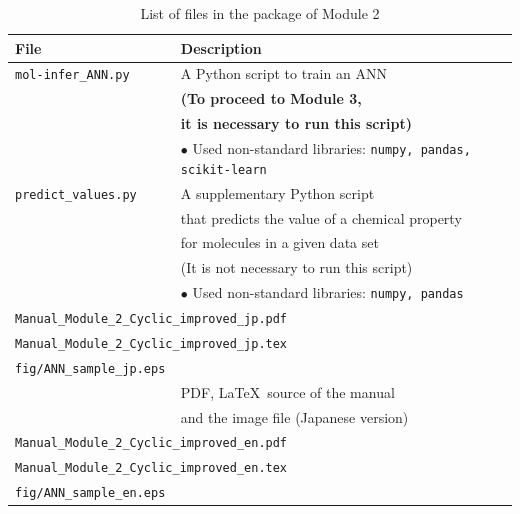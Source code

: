 \documentclass[11pt, titlepage, dvipdfmx, twoside]{article}
\begin{document}
\begin{table}[h!]
  \centering
  \caption{List of files in the package of Module 2}
  \label{tab:files}
  \begin{tabular}{lcll}
  \hline
  \bf File &\ \ & \multicolumn{2}{l}{\bf Description}\\
  \hline
  \verb|mol-infer_ANN.py| && \multicolumn{2}{l}{A Python script to train an ANN}\\
  &&\multicolumn{2}{l}{\bf (To proceed to Module 3,}\\
  &&\multicolumn{2}{l}{\bf it is necessary to run this script)}\\
  &&\multicolumn{2}{l}{$\bullet$ Used non-standard libraries: {\tt numpy, pandas, scikit-learn}}\\
  \hline
  \verb|predict_values.py| && \multicolumn{2}{l}{A supplementary Python script}\\
  &&\multicolumn{2}{l}{that predicts the value of a chemical property}\\
  &&\multicolumn{2}{l}{for molecules in a given data set}\\
  &&\multicolumn{2}{l}{(It is not necessary to run this script)}\\
  &&\multicolumn{2}{l}{$\bullet$ Used non-standard libraries: {\tt numpy, pandas}}\\
  \hline
  \multicolumn{4}{l}{\tt Manual\_Module\_2\_Cyclic\_improved\_jp.pdf}\\
  \multicolumn{4}{l}{\tt Manual\_Module\_2\_Cyclic\_improved\_jp.tex}\\
  \multicolumn{4}{l}{\tt fig/ANN\_sample\_jp.eps}\\
  &&\multicolumn{2}{l}{PDF, \LaTeX\  source of the manual}\\
  &&\multicolumn{2}{l}{and the image file (Japanese version)}\\
  \hline
  \multicolumn{4}{l}{\tt Manual\_Module\_2\_Cyclic\_improved\_en.pdf}\\
  \multicolumn{4}{l}{\tt Manual\_Module\_2\_Cyclic\_improved\_en.tex}\\
  \multicolumn{4}{l}{\tt fig/ANN\_sample\_en.eps}\\

\end{tabular}
\end{table}
\end{document}
